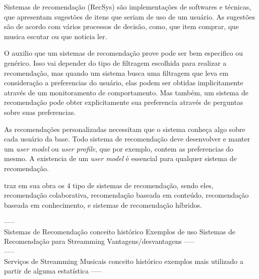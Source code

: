 \documentclass{article}
\begin{document}
Sistemas de recomendação (RecSys) são implementações de softwares e técnicas, que apresentam sugestões de itens que seriam de uso de um usuário. As sugestões são de acordo com vários processos de decisão, como, que item comprar, que musica escutar ou que noticia ler.  \cite{ricci2011introduction}

O auxilio que um sistemas de recomendação prove pode ser bem especifico ou genérico. Isso vai depender do tipo de filtragem escolhida para realizar a recomendação, mas quando um sistema busca uma filtragem que leva em consideração a preferencias do usuário, elas podem ser obtidas implicitamente através de um monitoramento de comportamento. Mas também, um sistema de recomendação pode obter explicitamente sua preferencia através de perguntas sobre suas preferencias.
\cite{jannach2010recommender}

As recomendações personalizadas necessitam que o sistema conheça algo sobre cada usuário da base.
Todo sistema de recomendação deve desenvolver e manter um \textit{user model} ou \textit{user profile}, que por exemplo, contem as preferencias do mesmo.
A existencia de um \textit{user model} é essencial para qualquer sistema de recomendação. \cite{jannach2010recommender}

\cite{ricci2011introduction} traz em sua obra os 4 tipo de sistemas de recomendação, sendo eles, recomendação colaborativa, recomendação baseada em conteúdo, recomendação baseada em conhecimento, e sistemas de recomendação híbridos.

----- \\

Sistemas de Recomendação
   conceito
   histórico
   Exemplos de uso
   Sistemas de Recomendação para Streamming
   Vantagens/desvantagens
----- \\






----- \\

Serviços de Streamming Musicais
  conceito
  histórico
  exemplos
  mais utilizado a partir de alguma estatística
----- \\
\end{document}
